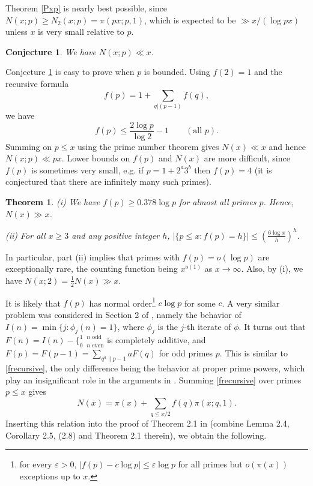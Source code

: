 \documentclass[12pt]{amsart}
\theoremstyle{remark}
\theoremstyle{plain}
\newtheorem{conj}{Conjecture}
\newtheorem{thm}{Theorem}
\numberwithin{equation}{section}
\newcommand{\be}{\begin{equation}}
\newcommand{\ee}{\end{equation}}
\newcommand{\eps}{\ensuremath{\varepsilon}}
\renewcommand{\(}{\left(}
\renewcommand{\)}{\right)}
\newcommand{\ds}{\displaystyle}
\newcommand{\pfrac}[2]{\left(\frac{#1}{#2}\right)}
\renewcommand{\le}{\leqslant}
\renewcommand{\ge}{\geqslant}
\begin{document}
Theorem \ref{Pxp} is nearly best possible, since 
 $N(x;p) \ge N_2(x;p) = \pi(px;p,1)$, which is expected to be $\gg x/(\log px)$
unless $x$ is very small relative to $p$.

\begin{conj}\label{Pxp_conj}
We have $N(x;p) \ll x$.
\end{conj}

Conjecture \ref{Pxp_conj} is easy to prove when $p$ is bounded.  Using 
$f(2)=1$ and the recursive formula
\be\label{frecursive} 
f(p) = 1+ \sum_{q|(p-1)} f(q), 
\ee
we have 
\be\label{fpupper}
 f(p) \le \frac{2\log p}{\log 2} - 1 \qquad (\text{all } p).
\ee
Summing on $p\le x$
using the prime number theorem gives $N(x)\ll x$ and hence
$N(x;p) \ll px$.  Lower bounds on $f(p)$ and $N(x)$ are more difficult,
since $f(p)$ is sometimes very small, e.g.
if $p=1+2^a3^b$ then $f(p)=4$ (it is conjectured that there are infinitely many
such primes).

\begin{thm}\label{Nx}
(i) We have $f(p)\ge 0.378 \log p$ for almost all primes $p$.  
Hence, $N(x)\gg x$.

(ii) For all $x\ge 3$ and any positive integer $h$,
$\ds | \{ p\le x : f(p)=h \}| \le \pfrac{6\log x}{h}^h.$
\end{thm}

In particular, part (ii) implies that
primes with $f(p)=o(\log p)$ are exceptionally rare, the counting function
being $x^{o(1)}$ as $x\to\infty$.  Also, by (i), we have
$N(x;2)=\frac12 N(x) \gg x$. 

It is likely that $f(p)$ has normal order\footnote{
for every $\eps>0$, $|f(p)-c\log p| \le \eps \log p$ for all primes 
but $o(\pi(x))$ exceptions up to $x$.} 
$c\log p$ for some $c$.  A very similar problem was considered
in Section 2 of \cite{EGPS}, namely the behavior of
$I(n)=\min\{j:\phi_j(n)=1\}$, where $\phi_j$ is the $j$-th iterate of $\phi$.
It turns out that
$F(n)=I(n)-\{^{1 \,\,\,\, n \,\, \text{odd}}_{0 \,\,\,\, n \,\, \text{even}}$ 
is completely additive, and
$F(p)=F(p-1) = \sum_{q^a \| p-1} a F(q)$ for odd primes $p$.
This is similar to \eqref{frecursive}, the only difference
being the behavior at proper prime powers, which play an insignificant
role in the arguments in \cite{EGPS}.  Summing \eqref{frecursive} over
primes $p\le x$ gives
\[
N(x) = \pi(x) + \sum_{q\le x/2} f(q) \pi(x;q,1). 
\]
Inserting this relation into the proof of Theorem 2.1 in \cite{EGPS} 
(combine
Lemma 2.4, Corollary 2.5, (2.8) and Theorem 2.1 therein), we obtain
the following.  
\end{document}
